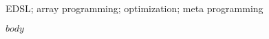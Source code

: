 \documentclass{sigplanconf}
\begin{document}

\keywords
EDSL; array programming; optimization; meta programming

$body$













\end{document}
